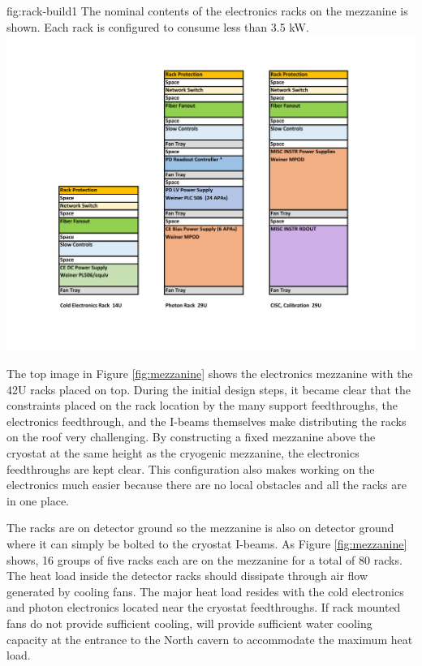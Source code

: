 \begin{dunefigure}{fig:rack-build1}
  {The nominal contents of the electronics racks on the mezzanine is shown. Each rack is configured to consume less than 3.5 \si{kW}. }
 \includegraphics[width=.98\textwidth]{graphics/rack-build1.pdf}
\end{dunefigure}

The top image in Figure \ref{fig:mezzanine} shows the  electronics mezzanine with the 42U racks placed on top. 
During the initial design steps, it became clear that the constraints placed on the rack location by the many  support feedthroughs, the electronics feedthrough, and the I-beams themselves make distributing the racks on the roof very challenging. 
By constructing a fixed mezzanine above the cryostat at the same height as the cryogenic mezzanine, the electronics feedthroughs are kept clear. 
This configuration also makes working on the electronics much easier because there are no local obstacles and all the racks are in one place.

The racks are on detector ground so the mezzanine is also on detector ground where it can simply be bolted to the cryostat I-beams. 
As Figure \ref{fig:mezzanine} shows, 16 groups of five racks each are on the mezzanine for a total of 80 racks. 
The heat load inside the detector racks should dissipate through air flow generated by cooling fans.  The major heat load resides with the cold electronics and photon electronics located near the cryostat feedthroughs.  If rack mounted fans do not provide sufficient cooling,   will provide sufficient water cooling capacity at the entrance to the North cavern to accommodate the maximum heat load. 


